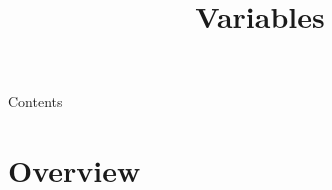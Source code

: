 
\newcommand{\topic}{
	Variables
}

\title{\topic}
\supertitle{\course}
\date{}



\maketitle

\begin{frame}{Contents}
	\tableofcontents
\end{frame}

\section{Overview}
